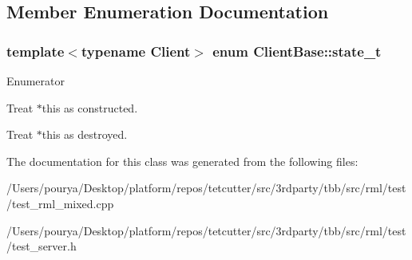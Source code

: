 \subsection{Member Enumeration Documentation}
\hypertarget{classClientBase_a2c65b478eaf40b5bf4c6f7fb83a81990}{}
\subsubsection[{state\+\_\+t}]{\setlength{\rightskip}{0pt plus 5cm}template$<$typename Client$>$ enum {\bf Client\+Base\+::state\+\_\+t}}\label{classClientBase_a2c65b478eaf40b5bf4c6f7fb83a81990}
\begin{Desc}
\item[Enumerator]\par
\begin{description}
\item[{\em 
\hypertarget{classClientBase_a2c65b478eaf40b5bf4c6f7fb83a81990a9c48c59ce92b8985d50fb31e0bba1b83}{}live\label{classClientBase_a2c65b478eaf40b5bf4c6f7fb83a81990a9c48c59ce92b8985d50fb31e0bba1b83}
}]Treat $\ast$this as constructed. \item[{\em 
\hypertarget{classClientBase_a2c65b478eaf40b5bf4c6f7fb83a81990a17121ecf8d6185605b0a86cd033a11d4}{}destroyed\label{classClientBase_a2c65b478eaf40b5bf4c6f7fb83a81990a17121ecf8d6185605b0a86cd033a11d4}
}]Treat $\ast$this as destroyed. \end{description}
\end{Desc}


The documentation for this class was generated from the following files\+:\begin{DoxyCompactItemize}
\item 
/\+Users/pourya/\+Desktop/platform/repos/tetcutter/src/3rdparty/tbb/src/rml/test/test\+\_\+rml\+\_\+mixed.\+cpp\item 
/\+Users/pourya/\+Desktop/platform/repos/tetcutter/src/3rdparty/tbb/src/rml/test/test\+\_\+server.\+h\end{DoxyCompactItemize}
